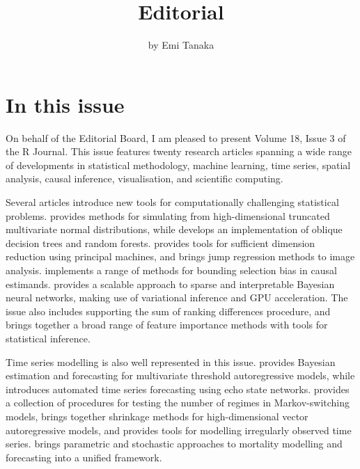 \title{Editorial}


\author{by Emi Tanaka}

\maketitle


\section*{In this issue}\label{in-this-issue}

On behalf of the Editorial Board, I am pleased to present Volume 18, Issue 3 of the R Journal. This issue features twenty research articles spanning a wide range of developments in statistical methodology, machine learning, time series, spatial analysis, causal inference, visualisation, and scientific computing.

Several articles introduce new tools for computationally challenging statistical problems.  provides methods for simulating from high-dimensional truncated multivariate normal distributions, while  develops an implementation of oblique decision trees and random forests.  provides tools for sufficient dimension reduction using principal machines, and  brings jump regression methods to image analysis.  implements a range of methods for bounding selection bias in causal estimands.  provides a scalable approach to sparse and interpretable Bayesian neural networks, making use of variational inference and GPU acceleration. The issue also includes  supporting the sum of ranking differences procedure, and  brings together a broad range of feature importance methods with tools for statistical inference.

Time series modelling is also well represented in this issue.  provides Bayesian estimation and forecasting for multivariate threshold autoregressive models, while  introduces automated time series forecasting using echo state networks.  provides a collection of procedures for testing the number of regimes in Markov-switching models,  brings together shrinkage methods for high-dimensional vector autoregressive models, and  provides tools for modelling irregularly observed time series.  brings parametric and stochastic approaches to mortality modelling and forecasting into a unified framework.

